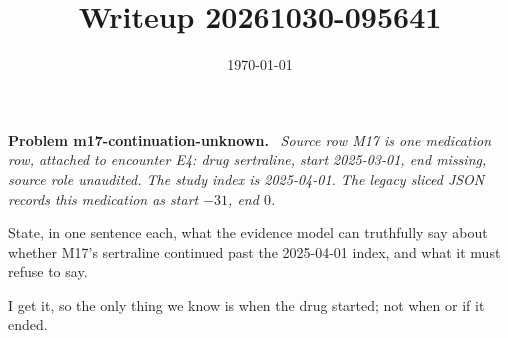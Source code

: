 \documentclass[11pt]{article}
\title{Writeup 20261030-095641}
\author{}
\date{\today}
\newenvironment{problem}[1]
  {\par\medskip\noindent\textbf{Problem #1.}\ \itshape}
  {\par\medskip}
\begin{document}
\maketitle


\begin{problem}{m17-continuation-unknown}
Source row M17 is one medication row, attached to encounter E4: drug sertraline, start 2025-03-01, end missing, source role unaudited. The study index is 2025-04-01. The legacy sliced JSON records this medication as start $-31$, end $0$.

State, in one sentence each, what the evidence model can truthfully say about whether M17's sertraline continued past the 2025-04-01 index, and what it must refuse to say.
\end{problem}
I get it, so the only thing we know is when the drug started; not when or if it ended.
\end{document}
